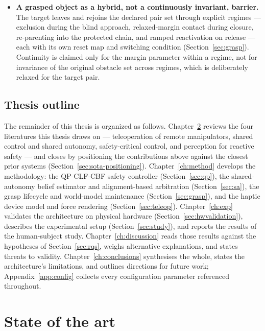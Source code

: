 \documentclass[12pt,a4paper,twoside,openright]{report}
\begin{document}
\begin{itemize}[nosep]
\item \textbf{A grasped object as a hybrid, not a continuously invariant, barrier.} The target leaves and rejoins the declared pair set through explicit regimes --- exclusion during the blind approach, relaxed-margin contact during closure, re-parenting into the protected chain, and ramped reactivation on release --- each with its own reset map and switching condition (Section~\ref{sec:grasp}). Continuity is claimed only for the margin parameter within a regime, not for invariance of the original obstacle set across regimes, which is deliberately relaxed for the target pair.
\end{itemize}

\section{Thesis outline}
\label{sec:outline}

The remainder of this thesis is organized as follows. Chapter~\ref{ch:sota} reviews the four literatures this thesis draws on --- teleoperation of remote manipulators, shared control and shared autonomy, safety-critical control, and perception for reactive safety --- and closes by positioning the contributions above against the closest prior systems (Section~\ref{sec:sota-positioning}). Chapter~\ref{ch:method} develops the methodology: the QP-CLF-CBF safety controller (Section~\ref{sec:qp}), the shared-autonomy belief estimator and alignment-based arbitration (Section~\ref{sec:sa}), the grasp lifecycle and world-model maintenance (Section~\ref{sec:grasp}), and the haptic device model and force rendering (Section~\ref{sec:teleop}). Chapter~\ref{ch:exp} validates the architecture on physical hardware (Section~\ref{sec:hwvalidation}), describes the experimental setup (Section~\ref{sec:study}), and reports the results of the human-subject study. Chapter~\ref{ch:discussion} reads those results against the hypotheses of Section~\ref{sec:rqs}, weighs alternative explanations, and states threats to validity. Chapter~\ref{ch:conclusions} synthesises the whole, states the architecture's limitations, and outlines directions for future work; Appendix~\ref{app:config} collects every configuration parameter referenced throughout.


\chapter{State of the art}
\label{ch:sota}
\end{document}
